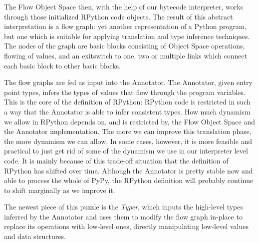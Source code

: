 \documentclass[a4paper,11pt,english]{article}
\begin{document}
The Flow Object Space then, with the help of our bytecode interpreter,
works through those initialized RPython code objects.  The result of
this abstract interpretation is a flow graph: yet another
representation of a Python program, but one which is suitable for
applying translation and type inference techniques.  The nodes of the
graph are basic blocks consisting of Object Space operations, flowing
of values, and an exitswitch to one, two or multiple links which connect
each basic block to other basic blocks.

The flow graphs are fed as input into the Annotator.  The Annotator,
given entry point types, infers the types of values that flow through
the program variables.  This is the core of the definition of RPython:
RPython code is restricted in such a way that the
Annotator is able to infer consistent types.  How much
dynamism we allow in RPython depends on, and is restricted by, the Flow
Object Space and the Annotator implementation.  The more we can improve
this translation phase, the more dynamism we can allow.  In some cases,
however, it is more feasible and practical to just get rid
of some of the dynamism we use in our interpreter level code.  It is
mainly because of this trade-off situation that the definition of
RPython has shifted over time.  Although the Annotator is
pretty stable now and able to process the whole of PyPy, the RPython
definition will probably continue to shift marginally as we improve it.

The newest piece of this puzzle is the
\emph{Typer}, which inputs the high-level types inferred by the Annotator and
uses them to modify the flow graph in-place to replace its operations with
low-level ones, directly manipulating low-level values and data structures.
\end{document}

